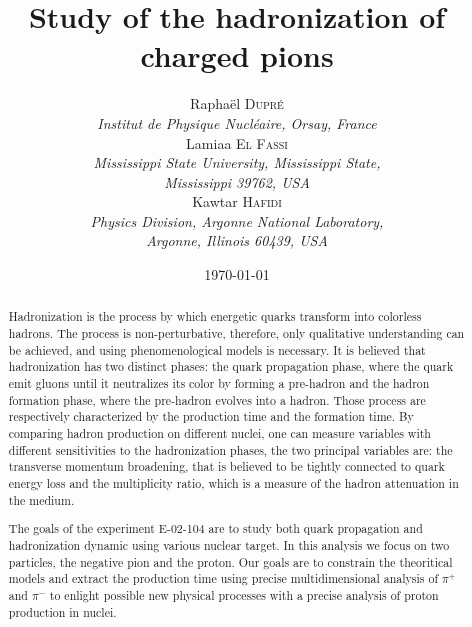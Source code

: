 \documentclass[a4paper,12pt,twoside]{article}
\title{Study of the hadronization of charged pions}
\author{
  Rapha\"el \textsc{Dupr\'e} \\ 
  {\it Institut de Physique Nucl\'eaire, Orsay, France} \\
  Lamiaa \textsc{El Fassi} \\ 
  {\it Mississippi State University, Mississippi State,} \\ 
  {\it Mississippi 39762, USA} \\
  Kawtar \textsc{Hafidi} \\ 
  {\it Physics Division, Argonne National Laboratory,} \\ 
  {\it Argonne, Illinois 60439, USA} 
}
\date{\today}
\begin{document}
\maketitle

\renewcommand{\baselinestretch}{1.10}

\begin{abstract}
Hadronization is the process by which energetic quarks transform into 
colorless hadrons. The process is non-perturbative, therefore, only 
qualitative understanding can be achieved, and using phenomenological models 
is necessary. It is believed that hadronization has two distinct phases: 
the quark propagation phase, where the quark emit gluons until it neutralizes 
its color by forming a pre-hadron and the hadron formation phase, where the 
pre-hadron evolves into a hadron. Those process are respectively characterized 
by the production time and the formation time. By comparing hadron production 
on different nuclei, one can measure variables with different sensitivities 
to the hadronization phases, the two principal variables are: the transverse 
momentum broadening, that is believed to be tightly connected to quark energy 
loss and the multiplicity ratio, which is a measure of the hadron attenuation 
in the medium.

The goals of the experiment E-02-104 are to study both quark propagation
and hadronization dynamic using various nuclear target.
In this analysis we focus on two particles, the negative pion and the proton.
Our goals are to constrain the theoritical models and extract the production
time using precise multidimensional analysis of $\pi^+$ and $\pi^-$ to enlight possible
new physical processes with a precise analysis of proton production in nuclei.

\end{abstract}

\newpage

\tableofcontents

\newpage









\end{document}
